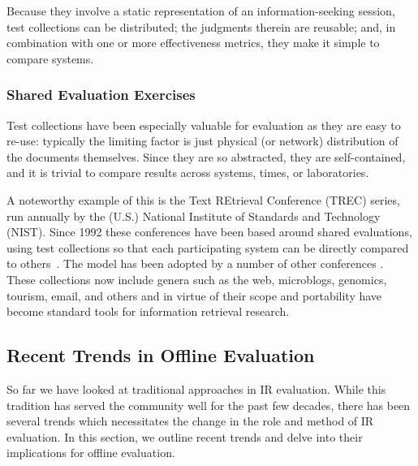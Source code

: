 \documentclass[openany]{now} %
\newcommand{\authornote}[3]{\marginpar{\tiny\color{#1}#2: #3}{\color{#1}{$\star$}}}
\newcommand{\paul}[1]{\authornote{blue}{Paul}{#1}}
\begin{document}
Because they involve a static representation of an information-seeking session, test collections can be distributed; the judgments therein are reusable; and, in combination with one or more effectiveness metrics, they make it simple to compare systems.

%

\subsubsection{Shared Evaluation Exercises}

Test collections have been especially valuable for evaluation as they are easy to re-use: typically the limiting factor is just physical (or network) distribution of the documents themselves. Since they are so abstracted, they are self-contained, and it is trivial to compare results across systems, times, or laboratories.

A noteworthy example of this is the Text REtrieval Conference (TREC) series, run annually by the (U.S.) National Institute of Standards and Technology (NIST). Since 1992 these conferences have been based around shared evaluations, using test collections so that each participating system can be directly compared to others~\cite{voor:trec05}. The model has been adopted by a number of other conferences \paul{refs}. These collections now include genera such as the web, microblogs, genomics, tourism, email, and others and in virtue of their scope and portability have become standard tools for information retrieval research.

\subsection{Recent Trends in Offline Evaluation}

So far we have looked at traditional approaches in IR evaluation. While this tradition has served the community well for the past few decades, there has been several trends which necessitates the change in the role and method of IR evaluation. In this section, we outline recent trends and delve into their implications for offline evaluation.
\end{document}
